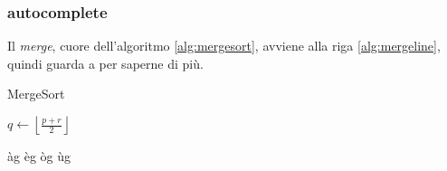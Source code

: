 \subsubsection{autocomplete}

Il \textit{merge}, cuore dell'algoritmo \ref{alg:mergesort}, avviene alla riga \ref{alg:mergeline}, quindi guarda a  per saperne di più.

\begin{algorithm}[h]
\caption{MergeSort}\label{alg:mergesort}
\begin{algorithmic}[1]
        \State $ q \gets \left\lfloor \frac{p+r}{2} \right\rfloor $ 
        \State {} 
        \State {} 
        \State
            \label{alg:mergeline}
    \EndIf
    \EndProcedure
\end{algorithmic}
\end{algorithm}

àg
èg
òg
ùg
